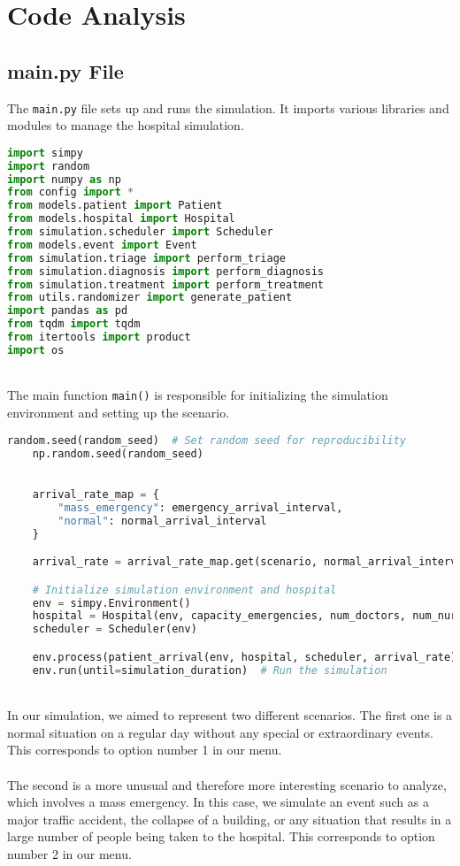 \documentclass[a4paper,12pt]{article}
\begin{document}
\section{Code Analysis}

\subsection{main.py File}
The \texttt{main.py} file sets up and runs the simulation. It imports various libraries and modules to manage the hospital simulation.

\begin{lstlisting}[language=Python]
import simpy
import random
import numpy as np
from config import *
from models.patient import Patient
from models.hospital import Hospital
from simulation.scheduler import Scheduler
from models.event import Event
from simulation.triage import perform_triage
from simulation.diagnosis import perform_diagnosis
from simulation.treatment import perform_treatment
from utils.randomizer import generate_patient
import pandas as pd
from tqdm import tqdm
from itertools import product
import os

\end{lstlisting}
\\ 
The main function \texttt{main()} is responsible for initializing the simulation environment and setting up the scenario.

\begin{lstlisting}[language=Python]
random.seed(random_seed)  # Set random seed for reproducibility
    np.random.seed(random_seed)

    
    arrival_rate_map = {
        "mass_emergency": emergency_arrival_interval,
        "normal": normal_arrival_interval
    }

    arrival_rate = arrival_rate_map.get(scenario, normal_arrival_interval)  # Si no se encuentra el escenario, usa el valor por defecto

    # Initialize simulation environment and hospital
    env = simpy.Environment()
    hospital = Hospital(env, capacity_emergencies, num_doctors, num_nurses, capacity_waiting_room, capacity_surgery_rooms)
    scheduler = Scheduler(env)

    env.process(patient_arrival(env, hospital, scheduler, arrival_rate))  # Start patient arrival process
    env.run(until=simulation_duration)  # Run the simulation

\end{lstlisting}
\\
In our simulation, we aimed to represent two different scenarios. The first one is a normal situation on a regular day without any special or extraordinary events. This corresponds to option number 1 in our menu.
\\
\\
The second is a more unusual and therefore more interesting scenario to analyze, which involves a mass emergency. In this case, we simulate an event such as a major traffic accident, the collapse of a building, or any situation that results in a large number of people being taken to the hospital. This corresponds to option number 2 in our menu.
\end{document}
